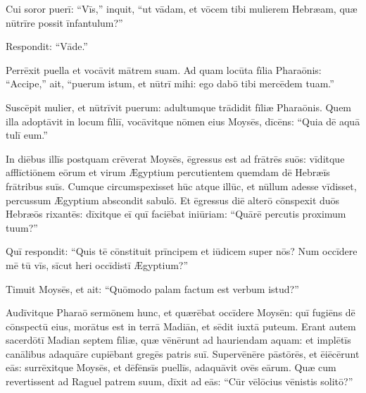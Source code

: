 Cui soror puerī: ``Vīs,'' inquit, ``ut vādam, et vōcem tibi mulierem Hebræam,
quæ nūtrīre possit īnfantulum?''

Respondit: ``Vāde.''

Perrēxit puella et vocāvit mātrem suam.
Ad quam locūta fīlia Pharaōnis: ``Accipe,'' ait, ``puerum istum, et nūtrī mihi: ego dabō tibi mercēdem tuam.''

Suscēpit mulier, et nūtrīvit puerum: adultumque trādidit fīliæ Pharaōnis. 
Quem illa adoptāvit in locum fīliī,
vocāvitque nōmen eius Moysēs, dīcēns: ``Quia dē aquā tulī eum.''

In diēbus illīs postquam crēverat Moysēs, ēgressus est ad frātrēs suōs:
vīditque afflīctiōnem eōrum et virum Ægyptium percutientem quemdam dē Hebræīs frātribus suīs.
Cumque circumspexisset hūc atque illūc,
et nūllum adesse vīdisset,
percussum Ægyptium abscondit sabulō.
Et ēgressus diē alterō cōnspexit duōs Hebræōs rixantēs:
dīxitque eī quī faciēbat iniūriam: ``Quārē percutis proximum tuum?''

Quī respondit: ``Quis tē cōnstituit prīncipem et iūdicem super nōs?
Num occīdere mē tū vīs, sīcut heri occīdistī Ægyptium?''

Timuit Moysēs, et ait: ``Quōmodo palam factum est verbum istud?''

Audīvitque Pharaō sermōnem hunc, et quærēbat occīdere Moysēn:
quī fugiēns dē cōnspectū eius, morātus est in terrā Madiān,
et sēdit iuxtā puteum.
Erant autem sacerdōtī Madian septem fīliæ,
quæ vēnērunt ad hauriendam aquam:
et implētīs canālibus adaquāre cupiēbant gregēs patris suī.
Supervēnēre pāstōrēs, et ēiēcērunt eās:
surrēxitque Moysēs, et dēfēnsīs puellīs, adaquāvit ovēs eārum. 
Quæ cum revertissent ad Raguel patrem suum, dīxit ad eās:
``Cūr vēlōcius vēnistis solitō?''

